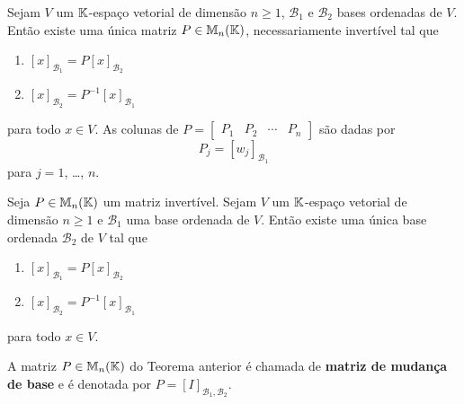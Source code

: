 \documentclass{beamer}
\begin{document}
\begin{frame}
    \begin{teorema}\label{teorema_mudanca_base}
        Sejam $V$ um $\mathbb{K}$-espaço vetorial de dimensão $n \ge 1$,  $\mathcal{B}_1$ e $\mathcal{B}_2$ bases ordenadas de $V$.  Então existe uma única matriz $P \in \mathbb{M}_n(\mathbb{K})$,  necessariamente invertível tal que
        \begin{enumerate}[label={\roman*})]
            \item $[x]_{\mathcal{B}_1} =  P[x]_{\mathcal{B}_2}$

            \vspace{1cm}

            \item $[x]_{\mathcal{B}_2} =  P^{-1}[x]_{\mathcal{B}_1}$
        \end{enumerate}
        
        \vspace{.2cm}

        para todo $x \in V$.  As colunas de $P = \begin{bmatrix}P_1 & P_2 & \cdots & P_n \end{bmatrix}$  são dadas por
        \[
            P_j = [w_j]_{\mathcal{B}_1}
        \]
        para $j = 1$, \dots, $n$.
    \end{teorema}
\end{frame}

\begin{frame}
    \begin{teorema}\label{teorema_matriz_mudanca_base}
        Seja $P \in \mathbb{M}_n(\mathbb{K})$ um matriz invertível.  Sejam $V$ um $\mathbb{K}$-espaço vetorial de dimensão $n \ge 1$  e $\mathcal{B}_1$ uma base ordenada de $V$.  Então existe uma única base ordenada $\mathcal{B}_2$  de $V$ tal que
        \begin{enumerate}[label={\roman*})]
            \item $[x]_{\mathcal{B}_1} =  P[x]_{\mathcal{B}_2}$

            \vspace{1cm}
            
            \item $[x]_{\mathcal{B}_2} =  P^{-1}[x]_{\mathcal{B}_1}$
        \end{enumerate}

        \vspace{.2cm}

        para todo $x \in V$.
\end{teorema}
\end{frame}

\begin{frame}
    \begin{definicao}
        A matriz $P \in \mathbb{M}_n(\mathbb{K})$  do Teorema anterior  é chamada de \textbf{matriz de mudança de base}  e é denotada por $P = [I]_{{\mathcal{B}_1},{\mathcal{B}_2}}$.
    \end{definicao}
\end{frame}
\end{document}
